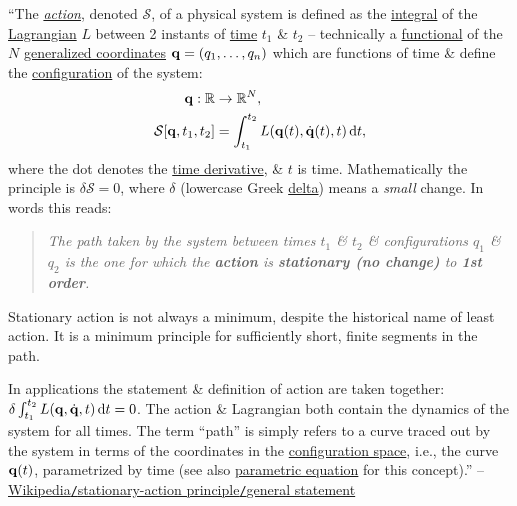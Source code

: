 \documentclass[oneside]{book}
\numberwithin{equation}{section}
\begin{document}
``The \href{https://en.wikipedia.org/wiki/Action_(physics)}{\textit{action}}, denoted $\mathcal{S}$, of a physical system is defined as the \href{https://en.wikipedia.org/wiki/Integral_(mathematics)}{integral} of the \href{https://en.wikipedia.org/wiki/Lagrangian_mechanics}{Lagrangian} $L$ between 2 instants of \href{https://en.wikipedia.org/wiki/Time_in_physics}{time} $t_1$ \& $t_2$ -- technically a \href{https://en.wikipedia.org/wiki/Functional_(mathematics)}{functional} of the $N$ \href{https://en.wikipedia.org/wiki/Generalized_coordinates}{generalized coordinates} ${\bf q} = (q_1,\ldots,q_n)$ which are functions of time \& define the \href{https://en.wikipedia.org/wiki/Configuration_space_(physics)}{configuration} of the system:
\begin{align*}
	{\bf q}:\mathbb{R}&\to\mathbb{R}^N,\\
	\mathcal{S}[{\bf q},t_1,t_2] &= \int_{t_1}^{t_2} L({\bf q}(t),\dot{\bf q}(t),t)\,{\rm d}t,
\end{align*}
where the dot denotes the \href{https://en.wikipedia.org/wiki/Time_derivative}{time derivative}, \& $t$ is time. Mathematically the principle is $\delta\mathcal{S} = 0$, where $\delta$ (lowercase Greek \href{https://en.wikipedia.org/wiki/Delta_(letter)}{delta}) means a \textit{small} change. In words this reads:
\begin{quotation}
	\textit{The path taken by the system between times $t_1$ \& $t_2$ \& configurations $q_1$ \& $q_2$ is the one for which the \textbf{action} is \textbf{stationary (no change)} to \textbf{1st order}.}
\end{quotation}
Stationary action is not always a minimum, despite the historical name of least action. It is a minimum principle for sufficiently short, finite segments in the path.

In applications the statement \& definition of action are taken together: $\delta\int_{t_1}^{t_2} L({\bf q},\dot{\bf q},t)\,{\rm d}t = 0$. The action \& Lagrangian both contain the dynamics of the system for all times. The term ``path'' is simply refers to a curve traced out by the system in terms of the coordinates in the \href{https://en.wikipedia.org/wiki/Configuration_space_(physics)}{configuration space}, i.e., the curve ${\bf q}(t)$, parametrized by time (see also \href{https://en.wikipedia.org/wiki/Parametric_equation}{parametric equation} for this concept).'' -- \href{https://en.wikipedia.org/wiki/Stationary-action_principle#General_statement}{Wikipedia\texttt{/}stationary-action principle\texttt{/}general statement}
\end{document}
